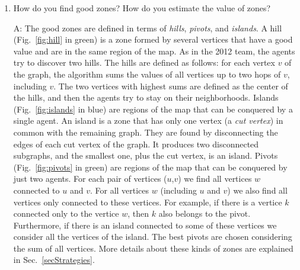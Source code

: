 \begin{enumerate}
\item How do you find good zones? How do you estimate the value of zones? %
	\item[A:] The good zones are defined in terms of \emph{hills}, \emph{pivots}, and \emph{islands}. A hill (Fig.~\ref{fig:hill} in green) is a zone formed by several vertices that have a good value and are in the same region of the map. As in the 2012 team, the agents try to discover two hills. The hills are defined as follows: for each vertex $v$ of the graph, the algorithm sums the values of all vertices up to two hops of $v$, including $v$. The two vertices with highest sums are defined as the center of the hills, and then the agents try to stay on their neighborhoods. Islands (Fig.~\ref{fig:islands} in blue) are regions of the map that can be conquered by a single agent. An island is a zone that has only one vertex (a \emph{cut vertex}) in common with the remaining graph.  They are found by disconnecting the edges of each cut vertex of the graph. It produces two disconnected subgraphs, and the smallest one, plus the cut vertex, is an island. Pivots (Fig.~\ref{fig:pivots} in green) are regions of the map that can be conquered by just two agents. For each pair of vertices ($u$,$v$) we find all vertices $w$ connected to $u$ and $v$. For all vertices $w$ (including $u$ and $v$) we also find all vertices only connected to these vertices. For example, if there is a vertice $k$ connected only to the vertice $w$, then $k$ also belongs to the pivot. Furthermore, if there is an island connected to some of these vertices we consider all the vertices of the island. The best pivots are chosen considering the sum of all vertices. More details about these kinds of zones are explained in Sec.~\ref{secStrategies}. \\
	

\end{enumerate}
